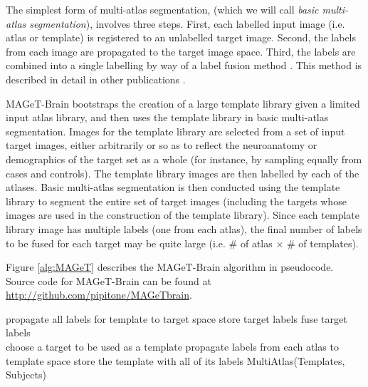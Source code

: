 \documentclass{article}\usepackage{graphicx, color}
\newcommand{\mb}{MAGeT-Brain }
\begin{document}
The simplest form of multi-atlas segmentation, (which we will call {\em basic 
multi-atlas segmentation}), involves three steps.  First, each labelled 
input image (i.e. atlas or template) is registered to an unlabelled target image.
Second, the labels from each image are propagated to the target image space. 
Third, the labels are combined into a single labelling by way of a label fusion method 
\citep{Heckemann2006, Heckemann2011}. This method is described in detail in other
publications \citep{Collins2010,Heckemann2011,Aljabar2009}.

\mb bootstraps the creation of a large template library given a limited input atlas 
library, and then uses the template library in basic multi-atlas segmentation. 
Images for the template library are selected from a set of input target images, 
either arbitrarily or so as to reflect the neuroanatomy or demographics of the 
target set as a whole (for instance, by sampling equally from cases and controls). 
The template library images are then labelled by each of the atlases. Basic 
multi-atlas segmentation is then conducted using the template library
to segment the entire set of target images (including the targets whose images
are used in the construction of the template library).  Since each template
library image has multiple labels (one from each atlas), the final number of 
labels to be fused for each target may be quite large (i.e. \# of atlas $\times$ 
\# of templates).

Figure \ref{alg:MAGeT} describes the \mb algorithm in pseudocode. Source code 
for \mb can be found at \url{http://github.com/pipitone/MAGeTbrain}.

\begin{algorithm}
  \scriptsize
  \caption{Pseudocode for the \mb algorithm}
  \label{alg:MAGeT}
  \begin{algorithmic}
          \State propagate all labels for template to target space
          \State store target labels
        \EndFor
        \State fuse target labels
      \EndFor
    \EndFunction
    \\
        \State choose a target to be used as a template
        \State propagate labels from each atlas to template space
        \State store the template with all of its labels
      \EndFor
      \State MultiAtlas(Templates, Subjects)
    \EndFunction
  \end{algorithmic}
\end{algorithm}
\end{document}
